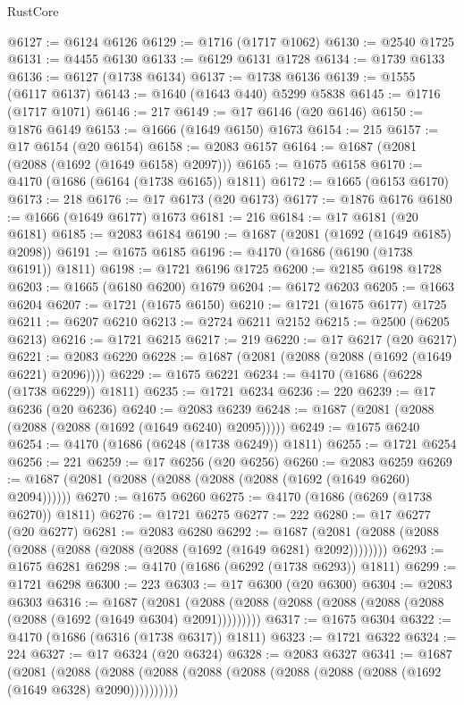 \begin{lexlean}{RustCore}
\begin{coremodule}
@6127 := @6124 @6126
@6129 := @1716 (@1717 @1062)
@6130 := @2540 @1725
@6131 := @4455 @6130
@6133 := @6129 @6131 @1728
@6134 := @1739 @6133
@6136 := @6127 (@1738 @6134)
@6137 := @1738 @6136
@6139 := @1555 (@6117 @6137)
@6143 := @1640 (@1643 @440) @5299 @5838
@6145 := @1716 (@1717 @1071)
@6146 := 217
@6149 := @17 @6146 (@20 @6146)
@6150 := @1876 @6149
@6153 := @1666 (@1649 @6150) @1673
@6154 := 215
@6157 := @17 @6154 (@20 @6154)
@6158 := @2083 @6157
@6164 := @1687 (@2081 (@2088 (@1692 (@1649 @6158) @2097)))
@6165 := @1675 @6158
@6170 := @4170 (@1686 (@6164 (@1738 @6165)) @1811)
@6172 := @1665 (@6153 @6170)
@6173 := 218
@6176 := @17 @6173 (@20 @6173)
@6177 := @1876 @6176
@6180 := @1666 (@1649 @6177) @1673
@6181 := 216
@6184 := @17 @6181 (@20 @6181)
@6185 := @2083 @6184
@6190 := @1687 (@2081 (@1692 (@1649 @6185) @2098))
@6191 := @1675 @6185
@6196 := @4170 (@1686 (@6190 (@1738 @6191)) @1811)
@6198 := @1721 @6196 @1725
@6200 := @2185 @6198 @1728
@6203 := @1665 (@6180 @6200) @1679
@6204 := @6172 @6203
@6205 := @1663 @6204
@6207 := @1721 (@1675 @6150)
@6210 := @1721 (@1675 @6177) @1725
@6211 := @6207 @6210
@6213 := @2724 @6211 @2152
@6215 := @2500 (@6205 @6213)
@6216 := @1721 @6215
@6217 := 219
@6220 := @17 @6217 (@20 @6217)
@6221 := @2083 @6220
@6228 := @1687 (@2081 (@2088 (@2088 (@1692 (@1649 @6221) @2096))))
@6229 := @1675 @6221
@6234 := @4170 (@1686 (@6228 (@1738 @6229)) @1811)
@6235 := @1721 @6234
@6236 := 220
@6239 := @17 @6236 (@20 @6236)
@6240 := @2083 @6239
@6248 := @1687 (@2081 (@2088 (@2088 (@2088 (@1692 (@1649 @6240) @2095)))))
@6249 := @1675 @6240
@6254 := @4170 (@1686 (@6248 (@1738 @6249)) @1811)
@6255 := @1721 @6254
@6256 := 221
@6259 := @17 @6256 (@20 @6256)
@6260 := @2083 @6259
@6269 := @1687 (@2081 (@2088 (@2088 (@2088 (@2088 (@1692 (@1649 @6260) @2094))))))
@6270 := @1675 @6260
@6275 := @4170 (@1686 (@6269 (@1738 @6270)) @1811)
@6276 := @1721 @6275
@6277 := 222
@6280 := @17 @6277 (@20 @6277)
@6281 := @2083 @6280
@6292 := @1687 (@2081 (@2088 (@2088 (@2088 (@2088 (@2088 (@2088 (@1692 (@1649 @6281) @2092))))))))
@6293 := @1675 @6281
@6298 := @4170 (@1686 (@6292 (@1738 @6293)) @1811)
@6299 := @1721 @6298
@6300 := 223
@6303 := @17 @6300 (@20 @6300)
@6304 := @2083 @6303
@6316 := @1687
    (@2081 (@2088 (@2088 (@2088 (@2088 (@2088 (@2088 (@2088 (@1692 (@1649 @6304) @2091)))))))))
@6317 := @1675 @6304
@6322 := @4170 (@1686 (@6316 (@1738 @6317)) @1811)
@6323 := @1721 @6322
@6324 := 224
@6327 := @17 @6324 (@20 @6324)
@6328 := @2083 @6327
@6341 := @1687
    (@2081
      (@2088 (@2088 (@2088 (@2088 (@2088 (@2088 (@2088 (@2088 (@1692 (@1649 @6328) @2090))))))))))

\end{coremodule}
\end{lexlean}
